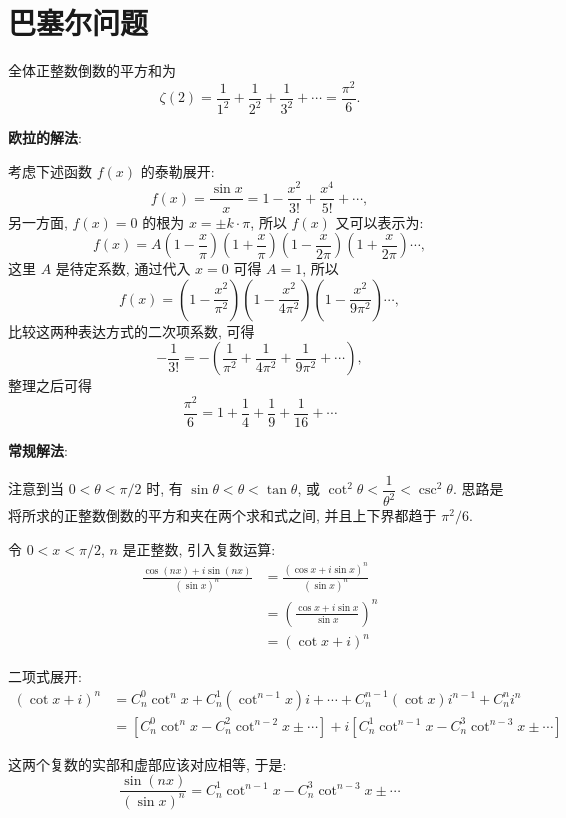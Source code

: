 \section{巴塞尔问题}
全体正整数倒数的平方和为 
\[ \zeta(2)= \frac{1}{1^2} +  \frac{1}{2^2} +  \frac{1}{3^2} +  \cdots = \frac{\pi^2}{6} . \]

\noindent\textbf{欧拉的解法}:

考虑下述函数 $ f(x) $ 的泰勒展开: 
\[ f(x) = \frac{\sin x}{x} = 1 - \frac{x^2}{3!} + \frac{x^4}{5!} + \cdots ,\] 
另一方面, $ f(x) = 0 $ 的根为 $ x = \pm k\cdot \pi $, 所以 $ f(x) $ 又可以表示为:
\[ f(x) = A(1-\frac{x}{\pi}) (1+\frac{x}{\pi}) (1-\frac{x}{2\pi}) (1+\frac{x}{2\pi}) \cdots ,\] 
这里 $ A $ 是待定系数, 通过代入 $ x = 0 $ 可得 $ A = 1 $, 所以
\[ f(x) = (1-\frac{x^2}{\pi^2}) (1-\frac{x^2}{4\pi^2}) (1-\frac{x^2}{9\pi^2}) \cdots ,\] 
比较这两种表达方式的二次项系数, 可得
\[ -\frac{1}{3!} = -(\frac{1}{\pi^2} + \frac{1}{4\pi^2} + \frac{1}{9\pi^2} + \cdots) ,\]
整理之后可得
\[ \frac{\pi^2}{6} = 1 + \frac{1}{4} + \frac{1}{9} + \frac{1}{16} + \cdots \]

\noindent\textbf{常规解法}:

注意到当 $ 0 < \theta < \pi/2 $ 时, 有 $ \sin\theta < \theta < \tan\theta $, 或 $ \cot^2\theta < \dfrac{1}{\theta^2} < \csc^2\theta $. 思路是将所求的正整数倒数的平方和夹在两个求和式之间, 并且上下界都趋于 $ \pi^2/6 $.

令 $ 0 < x < \pi/2 $, $ n $ 是正整数, 引入复数运算: 
\begin{align*} 
\frac{\cos(nx)+i\sin(nx)}{(\sin x)^n} &= \frac{(\cos x+i\sin x)^n}{(\sin x)^n} \\
	 &= \left( \frac{\cos x+i\sin x}{\sin x} \right)^n \\
	&= (\cot x + i)^n
\end{align*}

二项式展开:
\begin{align*}
(\cot x + i)^n &= C_n^0\cot^n x + C_n^1(\cot^{n-1}x)i + \cdots + C_n^{n-1}(\cot x)i^{n-1} + C_n^n i^n\\
				&= \left[ C_n^0\cot^n x - C_n^2\cot^{n-2} x \pm\cdots \right] + i\left[ C_n^1\cot^{n-1} x - C_n^3\cot^{n-3} x \pm\cdots \right]
\end{align*}

这两个复数的实部和虚部应该对应相等, 于是:
\[ \frac{\sin(nx)}{(\sin x)^n} = C_n^1\cot^{n-1} x - C_n^3\cot^{n-3} x \pm\cdots \]

